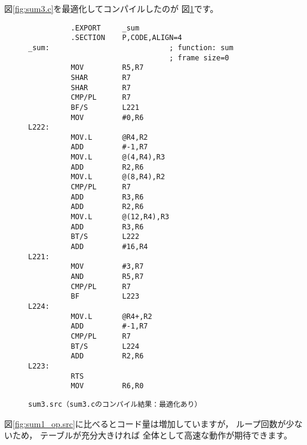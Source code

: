 \documentclass[a4j,10pt,fleqn]{jsarticle}
\begin{document}
図\ref{fig:sum3.c}を最適化してコンパイルしたのが
図\ref{fig:sum3_op.src}です。
\begin{figure}[tpb]
\begin{boxnote}
{\small\begin{verbatim}
          .EXPORT     _sum
          .SECTION    P,CODE,ALIGN=4
_sum:                            ; function: sum
                                 ; frame size=0
          MOV         R5,R7
          SHAR        R7
          SHAR        R7
          CMP/PL      R7
          BF/S        L221
          MOV         #0,R6
L222:
          MOV.L       @R4,R2
          ADD         #-1,R7
          MOV.L       @(4,R4),R3
          ADD         R2,R6
          MOV.L       @(8,R4),R2
          CMP/PL      R7
          ADD         R3,R6
          ADD         R2,R6
          MOV.L       @(12,R4),R3
          ADD         R3,R6
          BT/S        L222
          ADD         #16,R4
L221:
          MOV         #3,R7
          AND         R5,R7
          CMP/PL      R7
          BF          L223
L224:
          MOV.L       @R4+,R2
          ADD         #-1,R7
          CMP/PL      R7
          BT/S        L224
          ADD         R2,R6
L223:
          RTS
          MOV         R6,R0
\end{verbatim}}
\end{boxnote}
\caption{\texttt{sum3.src（sum3.cのコンパイル結果：最適化あり）}} \label{fig:sum3_op.src}
\end{figure}
図\ref{fig:sum1_op.src}に比べるとコード量は増加していますが，
ループ回数が少ないため，
テーブルが充分大きければ
全体として高速な動作が期待できます。
\end{document}
